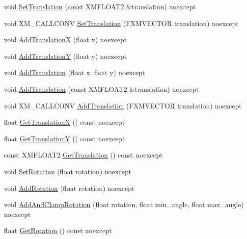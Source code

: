 \begin{DoxyCompactItemize}
\item 
void \hyperlink{structmage_1_1_texture_transform_a60b02d8f103e02d2f444997e61cb43c5}{Set\+Translation} (const X\+M\+F\+L\+O\+A\+T2 \&translation) noexcept
\item 
void X\+M\+\_\+\+C\+A\+L\+L\+C\+O\+NV \hyperlink{structmage_1_1_texture_transform_ad78b5f8482dd2a70ac7cde0aa5877f8c}{Set\+Translation} (F\+X\+M\+V\+E\+C\+T\+OR translation) noexcept
\item 
void \hyperlink{structmage_1_1_texture_transform_abf4622287ef1cec5dcc4cfd5da03f5ec}{Add\+TranslationX} (float x) noexcept
\item 
void \hyperlink{structmage_1_1_texture_transform_a53962a5137be3e0c9e3d9d74f2f6e6ee}{Add\+TranslationY} (float y) noexcept
\item 
void \hyperlink{structmage_1_1_texture_transform_a1710926d2f5292e2b3949fff92424971}{Add\+Translation} (float x, float y) noexcept
\item 
void \hyperlink{structmage_1_1_texture_transform_a0d81ff50baf9e21c48b8ac643bca819a}{Add\+Translation} (const X\+M\+F\+L\+O\+A\+T2 \&translation) noexcept
\item 
void X\+M\+\_\+\+C\+A\+L\+L\+C\+O\+NV \hyperlink{structmage_1_1_texture_transform_aa8a4a8d6dec5386a9e83b0c48c30a90a}{Add\+Translation} (F\+X\+M\+V\+E\+C\+T\+OR translation) noexcept
\item 
float \hyperlink{structmage_1_1_texture_transform_a4f9910896c1b2479d096631133e07fb2}{Get\+TranslationX} () const noexcept
\item 
float \hyperlink{structmage_1_1_texture_transform_acf1d96efb1c8062388c4ad96c50f793c}{Get\+TranslationY} () const noexcept
\item 
const X\+M\+F\+L\+O\+A\+T2 \hyperlink{structmage_1_1_texture_transform_afbb9d000cc5062982d5c20af4c885acb}{Get\+Translation} () const noexcept
\item 
void \hyperlink{structmage_1_1_texture_transform_aa185d0d366b817604dec89b9d80774e0}{Set\+Rotation} (float rotation) noexcept
\item 
void \hyperlink{structmage_1_1_texture_transform_a9f46842eec1e49453b9e922fd6874e57}{Add\+Rotation} (float rotation) noexcept
\item 
void \hyperlink{structmage_1_1_texture_transform_adf86494ee53ee0b20db30c392b9aeb01}{Add\+And\+Clamp\+Rotation} (float rotation, float min\+\_\+angle, float max\+\_\+angle) noexcept
\item 
float \hyperlink{structmage_1_1_texture_transform_a2c401693796a1d1b6a5480197fde5de1}{Get\+Rotation} () const noexcept

\end{DoxyCompactItemize}
